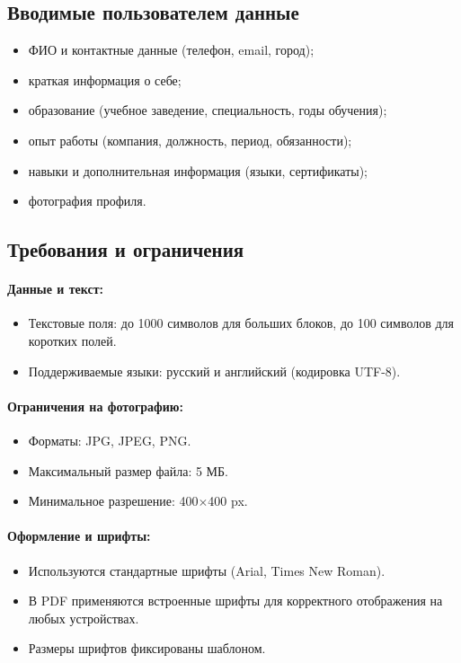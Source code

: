 \documentclass[a4paper, 14pt]{extarticle} %
\begin{document}
\subsection*{Вводимые пользователем данные}
\begin{itemize}
    \item ФИО и контактные данные (телефон, email, город);
    \item краткая информация о себе;
    \item образование (учебное заведение, специальность, годы обучения);
    \item опыт работы (компания, должность, период, обязанности);
    \item навыки и дополнительная информация (языки, сертификаты);
    \item фотография профиля.
\end{itemize}

\subsection*{Требования и ограничения}

\paragraph{Данные и текст:}
\begin{itemize}
    \item Текстовые поля: до 1000 символов для больших блоков, до 100 символов для коротких полей.
    \item Поддерживаемые языки: русский и английский (кодировка UTF-8).
\end{itemize}

\paragraph{Ограничения на фотографию:}
\begin{itemize}
    \item Форматы: JPG, JPEG, PNG.
    \item Максимальный размер файла: 5 МБ.
    \item Минимальное разрешение: 400$\times$400 px.
\end{itemize}

\paragraph{Оформление и шрифты:}
\begin{itemize}
    \item Используются стандартные шрифты (Arial, Times New Roman).
    \item В PDF применяются встроенные шрифты для корректного отображения на любых устройствах.
    \item Размеры шрифтов фиксированы шаблоном.
\end{itemize}
\end{document}
